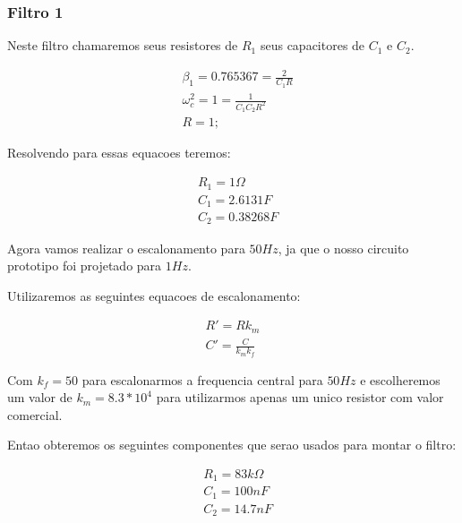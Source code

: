 \documentclass[12pt,twoside, a4paper, twocolumn]{article}
\begin{document}
\subsubsection{Filtro 1}

Neste filtro chamaremos seus resistores de $R_1$ seus capacitores de $C_1$ e $C_2$.

\begin{equation}
    \begin{aligned}
         & \beta_1 = 0.765367 = \frac{2}{C_1 R}   \\
         & \omega_c^2 = 1 = \frac{1}{C_1 C_2 R^2} \\
         & R = 1;
    \end{aligned}
\end{equation}

Resolvendo para essas equacoes teremos:

\begin{equation}
    \begin{aligned}
         & R_1 = 1 \varOmega \\
         & C_1 = 2.6131 F    \\
         & C_2 = 0.38268 F
    \end{aligned}
\end{equation}

Agora vamos realizar o escalonamento para $50Hz$, ja que o nosso circuito prototipo foi projetado para $1Hz$.

Utilizaremos as seguintes equacoes de escalonamento:

\begin{equation}
    \begin{aligned}
        R' = R  k_m \\
        C' = \frac{C}{k_m k_f}
    \end{aligned}
\end{equation}

Com $k_f = 50$ para escalonarmos a frequencia central para $50Hz$ e escolheremos um valor de $k_m = 8.3 * 10^4$ para utilizarmos apenas um unico resistor com valor comercial.

Entao obteremos os seguintes componentes que serao usados para montar o filtro:

\begin{equation}
    \begin{aligned}
         & R_1 = 83k \varOmega \\
         & C_1 = 100 nF        \\
         & C_2 = 14.7 nF
    \end{aligned}
\end{equation}
\end{document}
